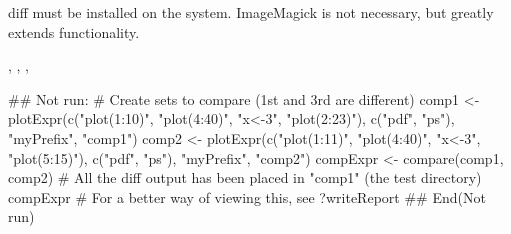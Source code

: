 \documentclass[a4paper,oneside]{book}
\begin{document}
\begin{Note}\relax
{} diff must be installed on the system. ImageMagick is not
necessary, but greatly extends functionality.
\end{Note}
\begin{SeeAlso}\relax
{}, ,
, 
\end{SeeAlso}
\begin{Examples}
\begin{ExampleCode}
## Not run: 
  # Create sets to compare (1st and 3rd are different)
  comp1 <- plotExpr(c("plot(1:10)", "plot(4:40)", "x<-3", "plot(2:23)"),
                    c("pdf", "ps"), "myPrefix", "comp1")
  comp2 <- plotExpr(c("plot(1:11)", "plot(4:40)", "x<-3", "plot(5:15)"),
                    c("pdf", "ps"), "myPrefix", "comp2")
  compExpr <- compare(comp1, comp2)
  # All the diff output has been placed in "comp1" (the test directory)
  compExpr
  # For a better way of viewing this, see ?writeReport
## End(Not run)
\end{ExampleCode}
\end{Examples}
\end{document}
